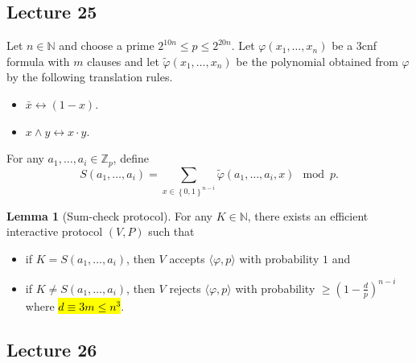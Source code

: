 \documentclass[10pt,letterpaper,cm]{nupset}
\theoremstyle{definition}
\theoremstyle{theorem}
\newtheorem{lemma}[definition]{Lemma}
\theoremstyle{remark}
\newcommand{\N}{\mathbb N}
\newcommand{\Z}{\mathbb Z}
\newcommand{\1}{\mathbf{1}}
\newcommand{\0}{\vec 0}
\begin{document}
\subsection{Lecture 25}

Let $n\in \N$ and choose a prime $2^{10n}\leq p\leq 2^{20n}$. Let  $\varphi(x_1, \ldots, x_n)$ be a 3cnf formula with $m$ clauses and let $\tilde{\varphi}(x_1, \ldots, x_n)$ be the polynomial obtained from $\varphi$ by the following translation rules.
\begin{itemize}
\item $\bar{x} \longleftrightarrow (1-x)$.
\item $x \land y \longleftrightarrow x \cdot y$.
\end{itemize} 
For any $a_1, \ldots, a_i \in \Z_p$, define $$S(a_1, \ldots, a_i) = \sum_{x\in \left\{0,1\right\}^{n-i}} \tilde{\varphi}(a_1, \ldots, a_i, x) \mod p.$$ 

\begin{lemma}[Sum-check protocol]\label{SCP}
For any $K\in \N$, there exists an efficient interactive protocol $\left(V, P\right)$ such that 
\begin{itemize}
\item if $K =S(a_1, \ldots, a_i)$, then $V$ accepts $\langle \varphi, p \rangle$ with probability $1$ and
\item if $K \ne S(a_1, \ldots, a_i)$, then $V$ rejects $\langle \varphi, p \rangle$ with probability $\geq \left(1-\frac{d}{p}\right)^{n-i}$ where \hl{$d \equiv 3m\leq n^3$}.
\end{itemize}
\end{lemma}


\subsection{Lecture 26}
\end{document}
